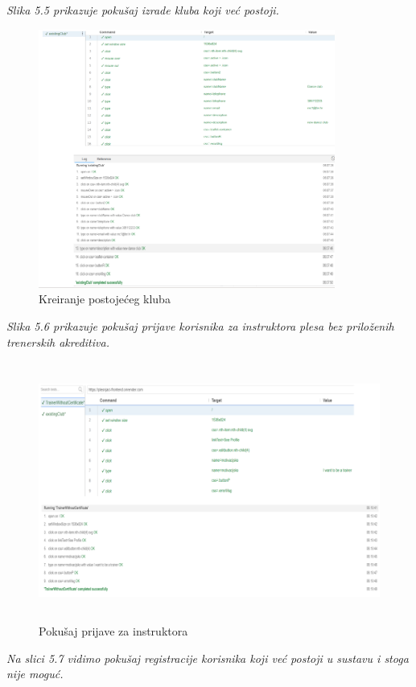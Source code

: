 			\newline
			\textit{
				Slika 5.5 prikazuje pokušaj izrade kluba koji već postoji. }
			\begin{figure}[H]
				\centering
				\includegraphics[width=\textwidth,height=8.5cm]{slike/slike_testova/SELENIUM_IDE/1.PNG}
				\caption{Kreiranje postojećeg kluba}
				\label{fig:my_label}
			\end{figure}
		\newpage
		\textit{
			Slika 5.6 prikazuje pokušaj prijave korisnika za instruktora plesa bez priloženih trenerskih akreditiva. }
		\begin{figure}[H]
			\centering
			\includegraphics[width=\textwidth,height=8.5cm]{slike/slike_testova/SELENIUM_IDE/2.PNG}
			\caption{Pokušaj prijave za instruktora}
			\label{fig:my_label}
		\end{figure}
	\textit{
		Na slici 5.7 vidimo pokušaj registracije korisnika koji već postoji u sustavu i stoga nije moguć. }

